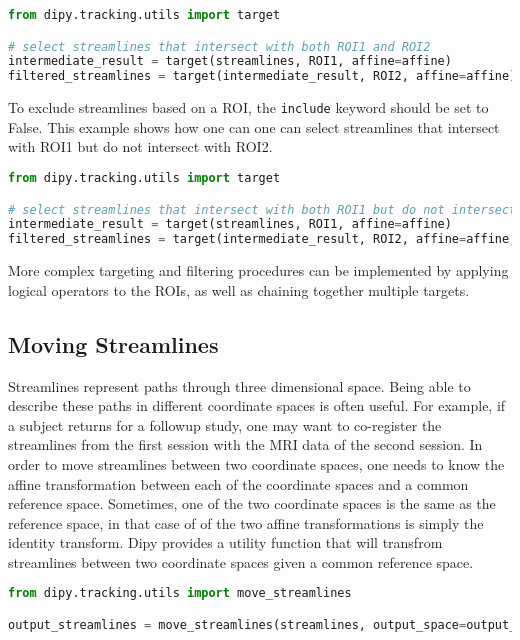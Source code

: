 \begin{lstlisting}[language=python]
from dipy.tracking.utils import target

# select streamlines that intersect with both ROI1 and ROI2
intermediate_result = target(streamlines, ROI1, affine=affine)
filtered_streamlines = target(intermediate_result, ROI2, affine=affine)

\end{lstlisting}

To exclude streamlines based on a ROI, the \verb|include| keyword should be set to False. This example shows how one can one can select streamlines that intersect with ROI1 but do not intersect with ROI2.

\begin{lstlisting}[language=python]
from dipy.tracking.utils import target

# select streamlines that intersect with both ROI1 but do not intersect with ROI2
intermediate_result = target(streamlines, ROI1, affine=affine)
filtered_streamlines = target(intermediate_result, ROI2, affine=affine, include=False)

\end{lstlisting}

More complex targeting and filtering procedures can be implemented by applying logical operators to the ROIs, as well as chaining together multiple targets.

\subsection{Moving Streamlines}

Streamlines represent paths through three dimensional space. Being able to describe these paths in different coordinate spaces is often useful. For example, if a subject returns for a followup study, one may want to co-register the streamlines from the first session with the MRI data of the second session. In order to move streamlines between two coordinate spaces, one needs to know the affine transformation between each of the coordinate spaces and a common reference space. Sometimes, one of the two coordinate spaces is the same as the reference space, in that case of of the two affine transformations is simply the identity transform. Dipy provides a utility function that will transfrom streamlines between two coordinate spaces given a common reference space.

\begin{lstlisting}[language=python]
from dipy.tracking.utils import move_streamlines

output_streamlines = move_streamlines(streamlines, output_space=output_affine, input_space=input_affine)
\end{lstlisting}

